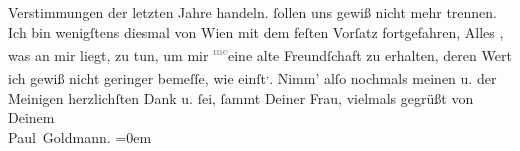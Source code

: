 \begin{ledgroupsized}[t]{13cm}
{{{                  Verstimmungen der letzten Jahre handeln.}}}\label{K_L03254-3h} ſollen uns gewiß nicht mehr trennen. Ich bin wenigſtens diesmal von
                  Wien mit dem feſten Vorſatz fortgefahren, Alles
                  , was an mir liegt, zu tun, um mir \substVorne{}\textsuperscript{\textcolor{gray}{me}}\substDazwischen{}eine\substHinten{} alte Freundſchaft zu erhalten, deren Wert ich gewiß nicht geringer bemeſſe,
               wie einſt\substVorne{}\textsuperscript{,}\substDazwischen{}.\substHinten{}\pend
           \pstart
           Nimm’ alſo nochmals meinen u. der Meinigen herzlichſten Dank u. ſei, ſammt
               Deiner Frau, vielmals gegrüßt
               von {\\[\baselineskip]}Deinem {\\[\baselineskip]}\spacefill\mbox{Paul Goldmann.}\pend
           \leftskip=0em{}
         
         \endnumbering{}\end{ledgroupsized}  \newcommand{\dateiname}{L03254}\newcommand{\titel}{Paul Goldmann an Arthur Schnitzler, 7. 7. 1907}\newcommand{\editorInnen}{Martin Anton Müller und Laura Untner}
      